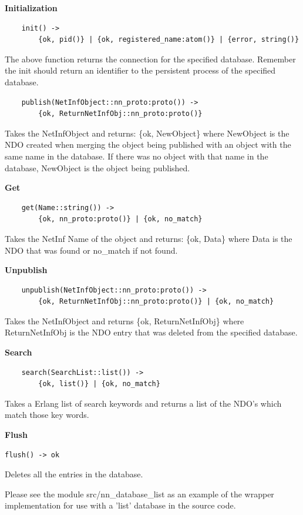 \textbf{Initialization}

\begin {verbatim}
    init() -> 
    	{ok, pid()} | {ok, registered_name:atom()} | {error, string()}
\end{verbatim}

The above function returns the connection for the specified database.
Remember the init should return an identifier to the persistent process of the specified database.

\begin {verbatim}
    publish(NetInfObject::nn_proto:proto()) -> 
    	{ok, ReturnNetInfObj::nn_proto:proto()}
\end{verbatim}

Takes the NetInfObject and returns: \{ok, NewObject\} where NewObject is the NDO created when merging the object being published with an object with the same name in the database. If there was no object with that name in the database, NewObject is the object being published.

\textbf{Get}

\begin {verbatim}
    get(Name::string()) -> 
    	{ok, nn_proto:proto()} | {ok, no_match}
\end{verbatim}

Takes the NetInf Name of the object and returns: \{ok, Data\} where Data is the NDO that was found or no\_match if not found.

\textbf{Unpublish}

\begin {verbatim}
    unpublish(NetInfObject::nn_proto:proto()) -> 
    	{ok, ReturnNetInfObj::nn_proto:proto()} | {ok, no_match}
\end{verbatim}

Takes the NetInfObject and returns \{ok, ReturnNetInfObj\} where ReturnNetInfObj is the NDO entry that was deleted from the specified database.

\textbf{Search}

\begin {verbatim}
    search(SearchList::list()) -> 
    	{ok, list()} | {ok, no_match}
\end{verbatim}

Takes a Erlang list of search keywords and returns a list of the NDO's which match those key words.

\textbf{Flush}

\begin{verbatim}
flush() -> ok
\end{verbatim}

Deletes all the entries in the database.   

Please see the module src/nn\_database\_list as an example of the wrapper implementation for use with a 'list' database in the source code.
